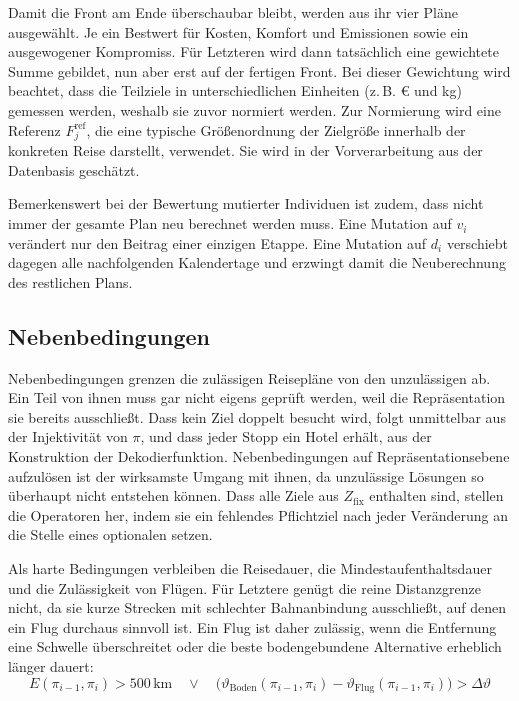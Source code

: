 Damit die Front am Ende überschaubar bleibt, werden aus ihr vier Pläne ausgewählt. Je ein Bestwert für Kosten, Komfort und Emissionen sowie ein ausgewogener Kompromiss. Für Letzteren wird dann tatsächlich eine gewichtete Summe gebildet, nun aber erst auf der fertigen Front. Bei dieser Gewichtung wird beachtet, dass die Teilziele in unterschiedlichen Einheiten (z.\,B. € und kg) gemessen werden, weshalb sie zuvor normiert werden. Zur Normierung wird eine Referenz $F_j^{\text{ref}}$, die eine typische Größenordnung der Zielgröße innerhalb der konkreten Reise darstellt, verwendet. Sie wird in der Vorverarbeitung aus der Datenbasis geschätzt.

Bemerkenswert bei der Bewertung mutierter Individuen ist zudem, dass nicht immer der gesamte Plan neu berechnet werden muss. Eine Mutation auf $v_i$ verändert nur den Beitrag einer einzigen Etappe. Eine Mutation auf $d_i$ verschiebt dagegen alle nachfolgenden Kalendertage und erzwingt damit die Neuberechnung des restlichen Plans.

\subsection{Nebenbedingungen}
\label{subsec:nebenbedingungen}

Nebenbedingungen grenzen die zulässigen Reisepläne von den unzulässigen ab. Ein Teil von ihnen muss gar nicht eigens geprüft werden, weil die Repräsentation sie bereits ausschließt. Dass kein Ziel doppelt besucht wird, folgt unmittelbar aus der Injektivität von $\pi$, und dass jeder Stopp ein Hotel erhält, aus der Konstruktion der Dekodierfunktion. Nebenbedingungen auf Repräsentationsebene aufzulösen ist der wirksamste Umgang mit ihnen, da unzulässige Lösungen so überhaupt nicht entstehen können. Dass alle Ziele aus $Z_{\text{fix}}$ enthalten sind, stellen die Operatoren her, indem sie ein fehlendes Pflichtziel nach jeder Veränderung an die Stelle eines optionalen setzen.

Als harte Bedingungen verbleiben die Reisedauer, die Mindestaufenthaltsdauer und die Zulässigkeit von Flügen. Für Letztere genügt die reine Distanzgrenze nicht, da sie kurze Strecken mit schlechter Bahnanbindung ausschließt, auf denen ein Flug durchaus sinnvoll ist. Ein Flug ist daher zulässig, wenn die Entfernung eine Schwelle überschreitet oder die beste bodengebundene Alternative erheblich länger dauert:
\begin{equation}
E(\pi_{i-1}, \pi_i) > 500\,\text{km} \quad\lor\quad \big( \vartheta_{\text{Boden}}(\pi_{i-1}, \pi_i) - \vartheta_{\text{Flug}}(\pi_{i-1}, \pi_i) \big) > \Delta\vartheta
\end{equation}

